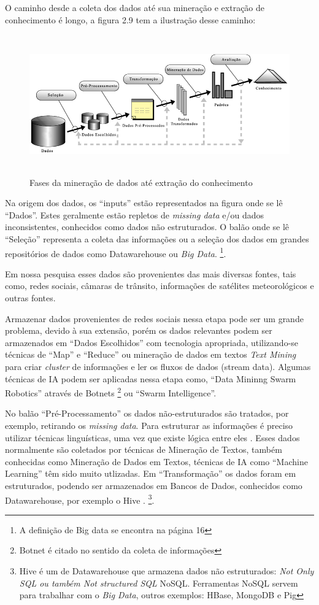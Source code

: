 O caminho desde a coleta dos dados até sua mineração e extração de conhecimento é longo, a figura 2.9 tem a ilustração desse caminho:

\begin{figure}[!ht]
	\centering
	\caption{Fases da mineração de dados até extração do conhecimento}
	\includegraphics[width=140mm, height=60mm]{Figuras/BigData/Fayyad.png}
\end{figure}

\pagebreak


Na origem dos dados, os ``inputs'' estão representados na figura onde se lê ``Dados''. Estes geralmente estão repletos de \textit{missing data} e/ou dados inconsistentes, conhecidos como dados não estruturados. 
O balão onde se lê ``Seleção'' representa a coleta das informações ou a seleção dos dados em grandes repositórios de dados como Datawarehouse ou \textit{Big Data}. \footnote{A definição de Big data se encontra na página 16}.


Em nossa pesquisa esses dados são provenientes das mais diversas fontes, tais como, redes sociais, câmaras de trânsito, informações de satélites meteorológicos e outras fontes.

Armazenar dados provenientes de redes sociais nessa etapa pode ser um grande problema, devido à sua extensão, porém os dados relevantes podem ser armazenados em ``Dados Escolhidos'' 
com tecnologia apropriada, utilizando-se técnicas de ``Map'' e ``Reduce'' ou mineração de dados em textos \textit{Text Mining} para criar \textit{cluster} de informações e ler os fluxos de dados (stream data). 
Algumas técnicas de IA podem ser aplicadas nessa etapa como, ``Data Mininng Swarm Robotics'' através de Botnets \footnote{Botnet é citado no sentido da coleta de informações} ou ``Swarm Intelligence''.

No balão ``Pré-Processamento'' os dados não-estruturados são tratados, por exemplo, retirando os \textit{missing data}. 
Para estruturar as informações é preciso utilizar técnicas linguísticas, uma vez que existe lógica entre eles \cite{Aranha2006}.
Esses dados normalmente são coletados por técnicas de Mineração de Textos, também conhecidas como Mineração de Dados em Textos, técnicas de IA como ``Machine Learning'' 
têm sido muito utlizadas. Em ``Transformação'' os dados foram em estruturados, podendo ser armazenados em Bancos de Dados, conhecidos como Datawarehouse, por exemplo o Hive \cite{NoSQL2015}. \footnote{Hive é um de Datawarehouse que armazena dados não estruturados: \textit{Not Only SQL ou também Not structured SQL} NoSQL. Ferramentas NoSQL servem para trabalhar com o \textit{Big Data}, outros exemplos: HBase, MongoDB e Pig}.

